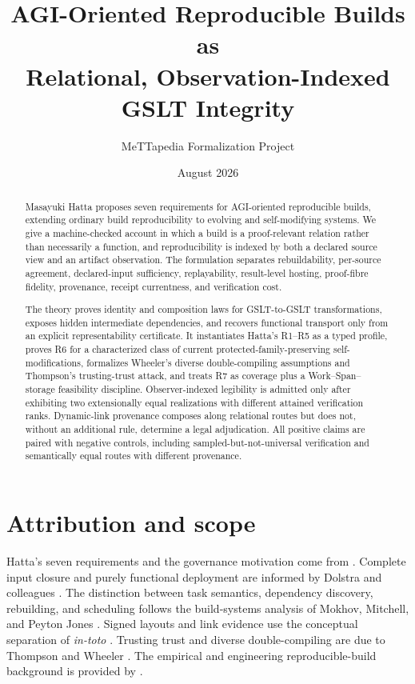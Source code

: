 \documentclass[11pt]{article}
\title{AGI-Oriented Reproducible Builds as\\
Relational, Observation-Indexed GSLT Integrity}
\author{MeTTapedia Formalization Project}
\date{August 2026}
\begin{document}
\maketitle

\begin{abstract}
Masayuki Hatta proposes seven requirements for AGI-oriented reproducible
builds, extending ordinary build reproducibility to evolving and
self-modifying systems.  We give a machine-checked account in which a build is
a proof-relevant relation rather than necessarily a function, and
reproducibility is indexed by both a declared source view and an artifact
observation.  The formulation separates rebuildability, per-source agreement,
declared-input sufficiency, replayability, result-level hosting, proof-fibre
fidelity, provenance, receipt currentness, and verification cost.

The theory proves identity and composition laws for GSLT-to-GSLT
transformations, exposes hidden intermediate dependencies, and recovers
functional transport only from an explicit representability certificate.  It
instantiates Hatta's R1--R5 as a typed profile, proves R6 for a characterized
class of current protected-family-preserving self-modifications, formalizes
Wheeler's diverse double-compiling assumptions and Thompson's trusting-trust
attack, and treats R7 as coverage plus a Work--Span--storage feasibility
discipline.  Observer-indexed legibility is admitted only after exhibiting two
extensionally equal realizations with different attained verification ranks.
Dynamic-link provenance composes along relational routes but does not, without
an additional rule, determine a legal adjudication.  All positive claims are
paired with negative controls, including sampled-but-not-universal
verification and semantically equal routes with different provenance.
\end{abstract}

\section{Attribution and scope}

Hatta's seven requirements and the governance motivation come from
\cite{hatta2026,hatta2025}.  Complete input closure and purely functional
deployment are informed by Dolstra and colleagues
\cite{dolstra2006,dolstra2004}.  The distinction between task semantics,
dependency discovery, rebuilding, and scheduling follows the build-systems
analysis of Mokhov, Mitchell, and Peyton Jones \cite{mokhov2020}.  Signed
layouts and link evidence use the conceptual separation of \emph{in-toto}
\cite{intoto2019}.  Trusting trust and diverse double-compiling are due to
Thompson and Wheeler \cite{thompson1984,wheeler2009}.  The empirical and
engineering reproducible-build background is provided by
\cite{lamb2021,malka2025}.
\end{document}
